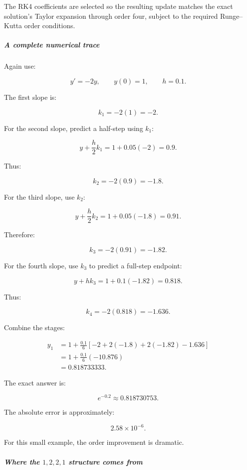 The RK4 coefficients are selected so the resulting update matches the exact solution's Taylor expansion through order four, subject to the required Runge--Kutta order conditions.

\subparagraph{A complete numerical trace}\label{02-foundations-ii-ch025-a-complete-numerical-trace}

\hypertarget{02-foundations-ii-ch025-a-complete-numerical-trace}{}

Again use:

\[
y'=-2y,\qquad y(0)=1,\qquad h=0.1.
\]

The first slope is:

\[
k_1=-2(1)=-2.
\]

For the second slope, predict a half-step using \(k_1\):

\[
y+\frac h2k_1 = 1+0.05(-2)=0.9.
\]

Thus:

\[
k_2=-2(0.9)=-1.8.
\]

For the third slope, use \(k_2\):

\[
y+\frac h2k_2 = 1+0.05(-1.8)=0.91.
\]

Therefore:

\[
k_3=-2(0.91)=-1.82.
\]

For the fourth slope, use \(k_3\) to predict a full-step endpoint:

\[
y+hk_3=1+0.1(-1.82)=0.818.
\]

Thus:

\[
k_4=-2(0.818)=-1.636.
\]

Combine the stages:

\[
\begin{aligned} y_1 &=1+\frac{0.1}{6} [-2+2(-1.8)+2(-1.82)-1.636]\\ &=1+\frac{0.1}{6}(-10.876)\\ &=\boxed{0.818733333}. \end{aligned}
\]

The exact answer is:

\[
e^{-0.2}\approx0.818730753.
\]

The absolute error is approximately:

\[
2.58\times10^{-6}.
\]

For this small example, the order improvement is dramatic.

\subparagraph{\texorpdfstring{Where the \(1,2,2,1\) structure comes from}{Where the 1,2,2,1 structure comes from}}\label{02-foundations-ii-ch025-where-the-1221-structure-comes-from}

\hypertarget{02-foundations-ii-ch025-where-the-1221-structure-comes-from}{}

